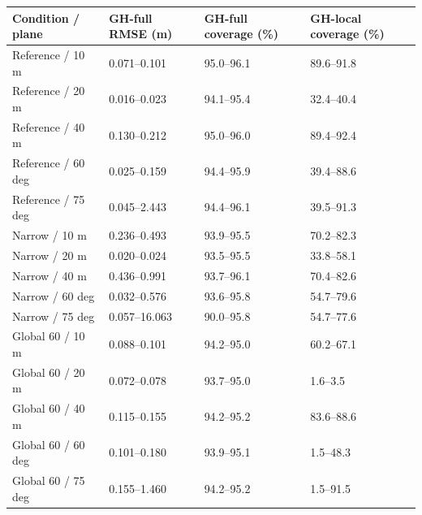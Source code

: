 \begin{tabular}{llll}
\hline
Condition / plane & GH-full RMSE (m) & GH-full coverage (\%) & GH-local coverage (\%) \\
\hline
Reference / 10 m & 0.071–0.101 & 95.0–96.1 & 89.6–91.8 \\
Reference / 20 m & 0.016–0.023 & 94.1–95.4 & 32.4–40.4 \\
Reference / 40 m & 0.130–0.212 & 95.0–96.0 & 89.4–92.4 \\
Reference / 60 deg & 0.025–0.159 & 94.4–95.9 & 39.4–88.6 \\
Reference / 75 deg & 0.045–2.443 & 94.4–96.1 & 39.5–91.3 \\
Narrow / 10 m & 0.236–0.493 & 93.9–95.5 & 70.2–82.3 \\
Narrow / 20 m & 0.020–0.024 & 93.5–95.5 & 33.8–58.1 \\
Narrow / 40 m & 0.436–0.991 & 93.7–96.1 & 70.4–82.6 \\
Narrow / 60 deg & 0.032–0.576 & 93.6–95.8 & 54.7–79.6 \\
Narrow / 75 deg & 0.057–16.063 & 90.0–95.8 & 54.7–77.6 \\
Global 60 / 10 m & 0.088–0.101 & 94.2–95.0 & 60.2–67.1 \\
Global 60 / 20 m & 0.072–0.078 & 93.7–95.0 & 1.6–3.5 \\
Global 60 / 40 m & 0.115–0.155 & 94.2–95.2 & 83.6–88.6 \\
Global 60 / 60 deg & 0.101–0.180 & 93.9–95.1 & 1.5–48.3 \\
Global 60 / 75 deg & 0.155–1.460 & 94.2–95.2 & 1.5–91.5 \\
\hline
\end{tabular}
